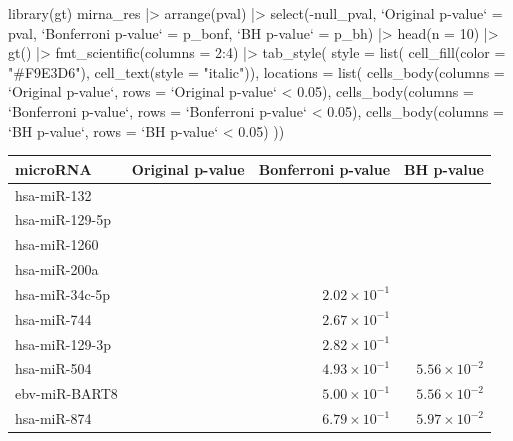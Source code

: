 \documentclass[a4paper]{article}\usepackage[]{graphicx}\usepackage[]{xcolor}
\begin{document}
\begin{Schunk}
\begin{Sinput}
library(gt)
mirna_res |> arrange(pval) |> 
  select(-null_pval, `Original p-value` = pval, 
         `Bonferroni p-value` = p_bonf,  `BH p-value` = p_bh) |> 
  head(n = 10) |> 
  gt() |> fmt_scientific(columns = 2:4) |> 
  tab_style(
    style = list(
      cell_fill(color = "#F9E3D6"),
      cell_text(style = "italic")),
    locations = list(
      cells_body(columns = `Original p-value`, 
                 rows = `Original p-value` < 0.05),
      cells_body(columns = `Bonferroni p-value`, 
                 rows = `Bonferroni p-value` < 0.05),
      cells_body(columns = `BH p-value`, rows = `BH p-value` < 0.05)
    ))
\end{Sinput}
\begin{longtable}{lrrr}
\toprule
microRNA & Original p-value & Bonferroni p-value & BH p-value \\ 
\midrule\addlinespace[2.5pt]
hsa-miR-132 & \cellcolor[HTML]{F9E3D6}{$1.28 \times 10^{-12}$} & \cellcolor[HTML]{F9E3D6}{$3.95 \times 10^{-10}$} & \cellcolor[HTML]{F9E3D6}{$3.95 \times 10^{-10}$} \\ 
hsa-miR-129-5p & \cellcolor[HTML]{F9E3D6}{$3.31 \times 10^{-7}$} & \cellcolor[HTML]{F9E3D6}{$1.02 \times 10^{-4}$} & \cellcolor[HTML]{F9E3D6}{$5.12 \times 10^{-5}$} \\ 
hsa-miR-1260 & \cellcolor[HTML]{F9E3D6}{$6.33 \times 10^{-5}$} & \cellcolor[HTML]{F9E3D6}{$1.96 \times 10^{-2}$} & \cellcolor[HTML]{F9E3D6}{$6.52 \times 10^{-3}$} \\ 
hsa-miR-200a & \cellcolor[HTML]{F9E3D6}{$1.31 \times 10^{-4}$} & \cellcolor[HTML]{F9E3D6}{$4.05 \times 10^{-2}$} & \cellcolor[HTML]{F9E3D6}{$1.01 \times 10^{-2}$} \\ 
hsa-miR-34c-5p & \cellcolor[HTML]{F9E3D6}{$6.54 \times 10^{-4}$} & $2.02 \times 10^{-1}$ & \cellcolor[HTML]{F9E3D6}{$4.03 \times 10^{-2}$} \\ 
hsa-miR-744 & \cellcolor[HTML]{F9E3D6}{$8.65 \times 10^{-4}$} & $2.67 \times 10^{-1}$ & \cellcolor[HTML]{F9E3D6}{$4.03 \times 10^{-2}$} \\ 
hsa-miR-129-3p & \cellcolor[HTML]{F9E3D6}{$9.13 \times 10^{-4}$} & $2.82 \times 10^{-1}$ & \cellcolor[HTML]{F9E3D6}{$4.03 \times 10^{-2}$} \\ 
hsa-miR-504 & \cellcolor[HTML]{F9E3D6}{$1.60 \times 10^{-3}$} & $4.93 \times 10^{-1}$ & $5.56 \times 10^{-2}$ \\ 
ebv-miR-BART8 & \cellcolor[HTML]{F9E3D6}{$1.62 \times 10^{-3}$} & $5.00 \times 10^{-1}$ & $5.56 \times 10^{-2}$ \\ 
hsa-miR-874 & \cellcolor[HTML]{F9E3D6}{$2.20 \times 10^{-3}$} & $6.79 \times 10^{-1}$ & $5.97 \times 10^{-2}$ \\ 
\bottomrule
\end{longtable}
\end{Schunk}
\newpage
\end{document}
